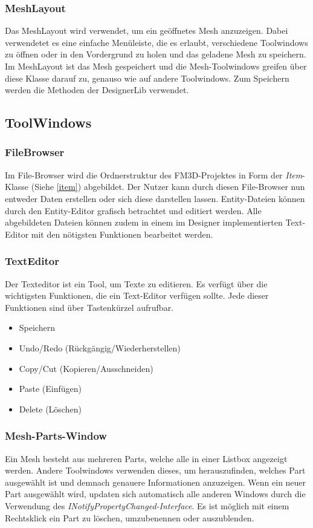 \subsubsection{MeshLayout}
Das MeshLayout wird verwendet, um ein geöffnetes Mesh anzuzeigen. Dabei verwendetet es eine einfache Menüleiste, die es erlaubt, verschiedene Toolwindows zu öffnen oder in den Vordergrund zu holen und das geladene Mesh zu speichern. Im MeshLayout ist das Mesh gespeichert und die Mesh-Toolwindows greifen über diese Klasse darauf zu, genauso wie auf andere Toolwindows. Zum Speichern werden die Methoden der DesignerLib verwendet.

\subsection{ToolWindows}
\subsubsection{FileBrowser}
\label{filebrowser}
Im File-Browser wird die Ordnerstruktur des FM3D-Projektes in Form der \textit{Item}-Klasse (Siehe \cref{item}) abgebildet. Der Nutzer kann durch diesen File-Browser nun entweder Daten erstellen oder sich diese darstellen lassen. Entity-Dateien können durch den Entity-Editor grafisch betrachtet und editiert werden. Alle abgebildeten Dateien können zudem in einem im Designer implementierten Text-Editor mit den nötigsten Funktionen bearbeitet werden.

\subsubsection{TextEditor}
Der Texteditor ist ein Tool, um Texte zu editieren. Es verfügt über die wichtigsten Funktionen, die ein Text-Editor verfügen sollte. Jede dieser Funktionen sind über Tastenkürzel aufrufbar.
\begin{itemize}
	\item Speichern
	\item Undo/Redo (Rückgängig/Wiederherstellen)
	\item Copy/Cut (Kopieren/Ausschneiden)
	\item Paste (Einfügen)
	\item Delete (Löschen)
\end{itemize}

\subsubsection{Mesh-Parts-Window}
Ein Mesh besteht aus mehreren Parts, welche alle in einer Listbox angezeigt werden. Andere Toolwindows verwenden dieses, um herauszufinden, welches Part ausgewählt ist und demnach genauere Informationen anzuzeigen. Wenn ein neuer Part ausgewählt wird, updaten sich automatisch alle anderen Windows durch die Verwendung des \textit{INotifyPropertyChanged-Interface}. Es ist möglich mit einem Rechtsklick ein Part zu löschen, umzubenennen oder auszublenden.

